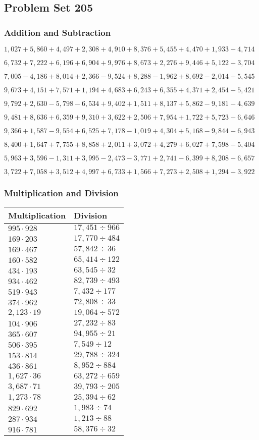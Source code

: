 \hypertarget{problem-set-205}{%
\subsection{Problem Set 205}\label{problem-set-205}}

\hypertarget{addition-and-subtraction}{%
\subsubsection{Addition and
Subtraction}\label{addition-and-subtraction}}

\(1,027+5,860+4,497+2,308+4,910+8,376+5,455+4,470+1,933+4,714\)

\(6,732+7,222+6,196+6,904+9,976+8,673+2,276+9,446+5,122+3,704\)

\(7,005-4,186+8,014+2,366-9,524+8,288-1,962+8,692-2,014+5,545\)

\(9,673+4,151+7,571+1,194+4,683+6,243+6,355+4,371+2,454+5,421\)

\(9,792+2,630-5,798-6,534+9,402+1,511+8,137+5,862-9,181-4,639\)

\(9,481+8,636+6,359+9,310+3,622+2,506+7,954+1,722+5,723+6,646\)

\(9,366+1,587-9,554+6,525+7,178-1,019+4,304+5,168-9,844-6,943\)

\(8,400+1,647+7,755+8,858+2,011+3,072+4,279+6,027+7,598+5,404\)

\(5,963+3,596-1,311+3,995-2,473-3,771+2,741-6,399+8,208+6,657\)

\(3,722+7,058+3,512+4,997+6,733+1,566+7,273+2,508+1,294+3,922\)

\hypertarget{multiplication-and-division}{%
\subsubsection{Multiplication and
Division}\label{multiplication-and-division}}

\begin{longtable}[]{@{}ll@{}}
\toprule
Multiplication & Division\tabularnewline
\midrule
\endhead
\(995\cdot928\) & \(17,451÷966\)\tabularnewline
\(169\cdot203\) & \(17,770÷484\)\tabularnewline
\(169\cdot467\) & \(57,842÷36\)\tabularnewline
\(160\cdot582\) & \(65,414÷122\)\tabularnewline
\(434\cdot193\) & \(63,545÷32\)\tabularnewline
\(934\cdot462\) & \(82,739÷493\)\tabularnewline
\(519\cdot943\) & \(7,432÷177\)\tabularnewline
\(374\cdot962\) & \(72,808÷33\)\tabularnewline
\(2,123\cdot19\) & \(19,064÷572\)\tabularnewline
\(104\cdot906\) & \(27,232÷83\)\tabularnewline
\(365\cdot607\) & \(94,955÷21\)\tabularnewline
\(506\cdot395\) & \(7,549÷12\)\tabularnewline
\(153\cdot814\) & \(29,788÷324\)\tabularnewline
\(436\cdot861\) & \(8,952÷884\)\tabularnewline
\(1,627\cdot36\) & \(63,272÷659\)\tabularnewline
\(3,687\cdot71\) & \(39,793÷205\)\tabularnewline
\(1,273\cdot78\) & \(25,394÷62\)\tabularnewline
\(829\cdot692\) & \(1,983÷74\)\tabularnewline
\(287\cdot934\) & \(1,213÷88\)\tabularnewline
\(916\cdot781\) & \(58,376÷32\)\tabularnewline
\bottomrule
\end{longtable}
